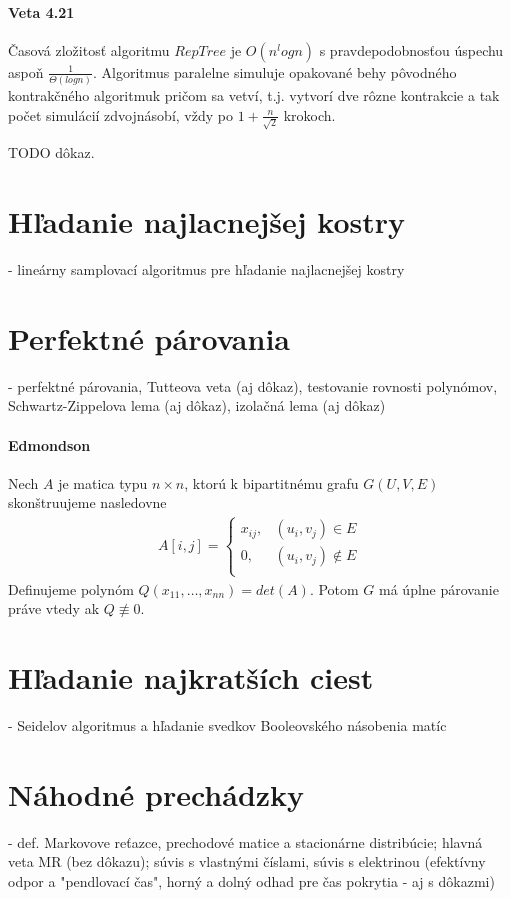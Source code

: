 \documentclass[12pt,a4paper]{article}
\begin{document}
\paragraph{Veta 4.21} Časová zložitosť algoritmu $RepTree$ je $O(n^logn)$ s pravdepodobnosťou úspechu aspoň $\frac{1}{\Theta(log n)}$. Algoritmus paralelne simuluje opakované behy pôvodného kontrakčného algoritmuk pričom sa vetví, t.j. vytvorí dve rôzne kontrakcie a tak počet simulácií zdvojnásobí, vždy po $1 + \frac{n}{\sqrt{2}}$ krokoch.  

TODO dôkaz. 

\section{Hľadanie najlacnejšej kostry}
 - lineárny samplovací algoritmus pre hľadanie najlacnejšej kostry
 

\section{Perfektné párovania}
 - perfektné párovania, Tutteova veta (aj dôkaz), testovanie rovnosti polynómov, Schwartz-Zippelova lema (aj dôkaz), izolačná lema (aj dôkaz)
 
\paragraph{Edmondson} Nech $A$ je matica typu $n \times n$, ktorú k bipartitnému grafu $G(U,V,E)$ skonštruujeme nasledovne
\begin{align*} 
A[i,j] = \left\{ 
  \begin{array}{ll}
    x_{ij}, & (u_i, v_j) \in E \\
    0, & (u_i, v_j) \not\in E \\
  \end{array} 
\right.
\end{align*} 
Definujeme polynóm $Q(x_{11}, \ldots, x_{nn}) = det(A)$. Potom $G$ má úplne párovanie práve vtedy ak $Q \not\equiv 0$. 

\section{Hľadanie najkratších ciest}
 - Seidelov algoritmus a hľadanie svedkov Booleovského násobenia matíc
 

\section{Náhodné prechádzky}
 - def. Markovove reťazce, prechodové matice a stacionárne distribúcie; hlavná veta MR (bez dôkazu); súvis s vlastnými číslami, súvis s elektrinou (efektívny odpor a "pendlovací čas", horný a dolný odhad pre čas pokrytia - aj s dôkazmi)
 
\end{document}
